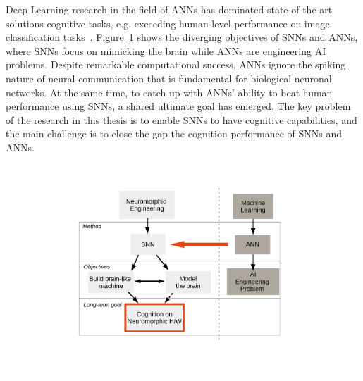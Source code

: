 Deep Learning research in the field of ANNs has dominated \DIFdelbegin {}\DIFdelend state-of-the-art solutions \DIFdelbegin {}\DIFdelend \DIFaddbegin {}\DIFaddend cognitive tasks, e.g. \DIFdelbegin {}\DIFdelend exceeding human-level performance on image classification tasks~\citep{he2015delving}.
Figure~\ref{fig:intro} shows the diverging objectives of SNNs and ANNs, where SNNs focus on mimicking the brain while ANNs are \DIFdelbegin {}\DIFdelend \DIFaddbegin {}\DIFaddend engineering AI problems.
Despite remarkable computational success, ANNs ignore the spiking nature of neural communication that is fundamental for biological neuronal networks.
At the same time, to catch up with ANNs' ability to beat human performance using SNNs, a shared ultimate goal has emerged.
The key problem of the research \DIFdelbegin {}\DIFdelend \DIFaddbegin {}\DIFaddend in this thesis is to enable SNNs to have cognitive capabilities, and the main challenge is to close the gap \DIFdelbegin {}\DIFdelend \DIFaddbegin {}\DIFaddend the cognition performance of SNNs and \DIFaddbegin {}\DIFaddend ANNs.

\DIFaddbegin {}

\begin{figure}[tbh!]
	\centering
	\includegraphics[width=1.0\textwidth]{pics_intro/intro2.pdf}
	\caption{}
	\label{fig:intro}
\end{figure}
\DIFaddend 




